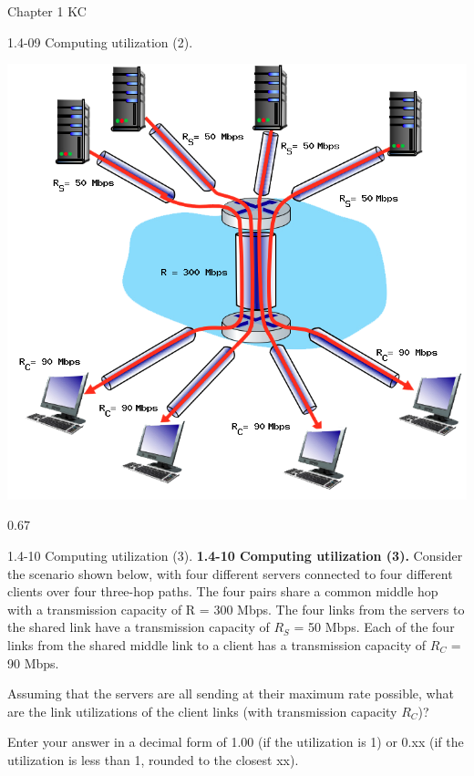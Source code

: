 \documentclass[a4paper]{article}
\begin{document}
\begin{quiz}{Chapter 1 KC}
\begin{shortanswer}[points=1,shuffle=true]{1.4-09 Computing utilization (2).}
\begin{center}
\includegraphics[width=.7\linewidth]{figs/1.4.7.png}
\end{center}
\item 0.67
\end{shortanswer}

\begin{shortanswer}[points=1,shuffle=true]{1.4-10 Computing utilization (3).}
\textbf{1.4-10 Computing utilization (3).} 
Consider the scenario shown below, with four different servers connected to four different clients over four three-hop paths. The four pairs share a common middle hop with a transmission capacity of R = 300 Mbps. The four links from the servers to the shared link have a transmission capacity of $R_S$ = 50 Mbps. Each of the four links from the shared middle link to a client has a transmission capacity of $R_C$ = 90 Mbps. 

Assuming that the servers are all sending at their maximum rate possible, what are the link utilizations of the client links (with transmission capacity $R_C$)? 

Enter your answer in a decimal form of 1.00 (if the utilization is 1) or 0.xx (if the utilization is less than 1, rounded to the closest xx).


\end{shortanswer}
\end{quiz}
\end{document}
